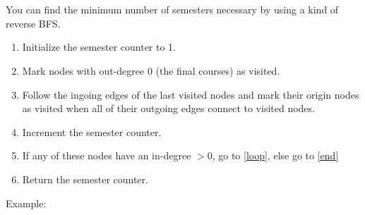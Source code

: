 \documentclass[12pt]{article}
\begin{document}
\section{} %
You can find the minimum number of semesters necessary by using a kind of reverse BFS.

\begin{enumerate}
	\item Initialize the semester counter to 1.
	\item Mark nodes with out-degree 0 (the final courses) as visited.
	\item \label{loop} Follow the ingoing edges of the last visited nodes and mark their origin nodes as visited when all of their outgoing edges connect to visited nodes.
	\item Increment the semester counter.
	\item If any of these nodes have an in-degree $> 0$, go to \ref{loop}, else go to \ref{end}
	\item \label{end} Return the semester counter.
\end{enumerate}

Example:

\end{document}
